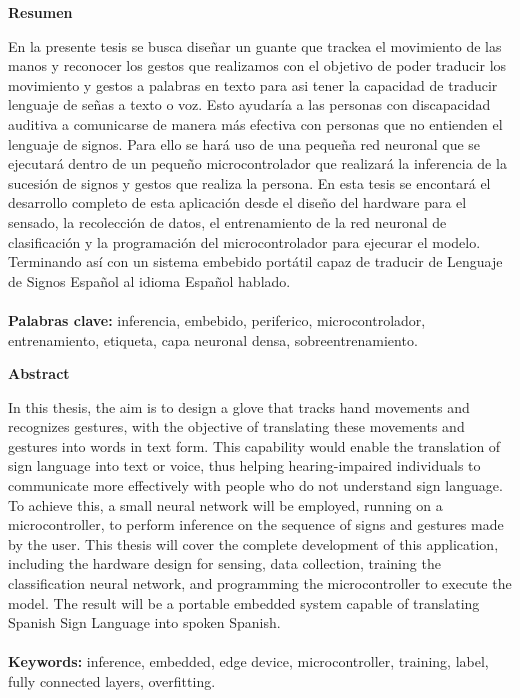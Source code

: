 \thispagestyle{plain}

\begin{center}
  \large
  \textbf{Resumen}
\end{center}

En la presente tesis se busca diseñar un guante que trackea el movimiento de las manos y reconocer los gestos que realizamos con el objetivo de poder traducir los movimiento y gestos a palabras en texto para asi tener la capacidad de traducir lenguaje de señas a texto o voz. Esto ayudaría a las personas con discapacidad auditiva a comunicarse de manera más efectiva con personas que no entienden el lenguaje de signos. Para ello se hará uso de una pequeña red neuronal que se ejecutará dentro de un pequeño microcontrolador que realizará la inferencia de la sucesión de signos y gestos que realiza la persona. En esta tesis se encontará el desarrollo completo de esta aplicación desde el diseño del hardware para el sensado, la recolección de datos, el entrenamiento de la red neuronal de clasificación y la programación del microcontrolador para ejecurar el modelo. Terminando así con un sistema embebido portátil capaz de traducir de Lenguaje de Signos Español al idioma Español hablado.
\\
\\
\textbf{Palabras clave:} inferencia, embebido, periferico, microcontrolador, entrenamiento, etiqueta, capa neuronal densa, sobreentrenamiento.

\newpage
\thispagestyle{plain}
\begin{center}
  \large
  \textbf{Abstract}
\end{center}

In this thesis, the aim is to design a glove that tracks hand movements and recognizes gestures, with the objective of translating these movements and gestures into words in text form. This capability would enable the translation of sign language into text or voice, thus helping hearing-impaired individuals to communicate more effectively with people who do not understand sign language. To achieve this, a small neural network will be employed, running on a microcontroller, to perform inference on the sequence of signs and gestures made by the user. This thesis will cover the complete development of this application, including the hardware design for sensing, data collection, training the classification neural network, and programming the microcontroller to execute the model. The result will be a portable embedded system capable of translating Spanish Sign Language into spoken Spanish.
\\
\\
\textbf{Keywords:} inference, embedded, edge device, microcontroller, training, label, fully connected layers, overfitting.
